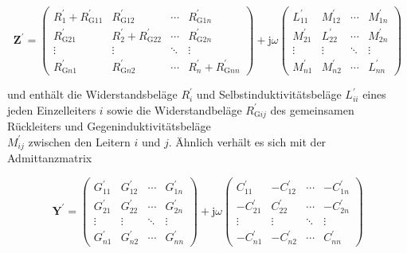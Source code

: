 \begin{equation}
	\mathbf{Z}^{\prime}=\left(\begin{array}{cccc}
		R_{1}^{\prime}+R_{\mathrm{G} 11}^{\prime} & R_{\mathrm{G} 12}^{\prime} & \cdots & R_{\mathrm{G} 1 n}^{\prime}  \\
		R_{\mathrm{G} 21}^{\prime} & R_{2}^{\prime}+R_{\mathrm{G} 22}^{\prime} & \cdots & R_{\mathrm{G} 2 n}^{\prime} \\
		\vdots & \vdots & \ddots & \vdots \\
		R_{\mathrm{G} n 1}^{\prime} & R_{\mathrm{G} n 2}^{\prime} & \cdots & R_{n}^{\prime}+R_{\mathrm{G} n n}^{\prime}
	\end{array}\right)+\mathrm{j} \omega\left(\begin{array}{cccc}
		L_{11}^{\prime} & M_{12}^{\prime} & \cdots & M_{1 n}^{\prime} \\
		M_{21}^{\prime} & L_{22}^{\prime} & \cdots & M_{2 n}^{\prime} \\
		\vdots & \vdots & \ddots & \vdots \\
		M_{n 1}^{\prime} & M_{n 2}^{\prime} & \cdots & L_{n n}^{\prime}
	\end{array}\right)
\end{equation}

und enthält die Widerstandsbeläge $R_{i}^{\prime}$ und Selbstinduktivitätsbeläge $L_{i i}^{\prime}$ eines jeden Einzelleiters $i$ sowie die Widerstandbeläge $R_{\mathrm{G} i j}^{\prime}$ des gemeinsamen Rückleiters und Gegeninduktivitätsbeläge\\
$M_{i j}^{\prime}$ zwischen den Leitern $i$ und $j$. Ähnlich verhält es sich mit der Admittanzmatrix

\begin{equation}
	\mathbf{Y}^{\prime}=\left(\begin{array}{cccc}
		G_{11}^{\prime} & G_{12}^{\prime} & \cdots & G_{1 n}^{\prime}  \\
		G_{21}^{\prime} & G_{22}^{\prime} & \cdots & G_{2 n}^{\prime} \\
		\vdots & \vdots & \ddots & \vdots \\
		G_{n 1}^{\prime} & G_{n 2}^{\prime} & \cdots & G_{n n}^{\prime}
	\end{array}\right)+\mathrm{j} \omega\left(\begin{array}{cccc}
		C_{11}^{\prime} & -C_{12}^{\prime} & \cdots & -C_{1 n}^{\prime} \\
		-C_{21}^{\prime} & C_{22}^{\prime} & \cdots & -C_{2 n}^{\prime} \\
		\vdots & \vdots & \ddots & \vdots \\
		-C_{n 1}^{\prime} & -C_{n 2}^{\prime} & \cdots & C_{n n}^{\prime}
	\end{array}\right)
\end{equation}

